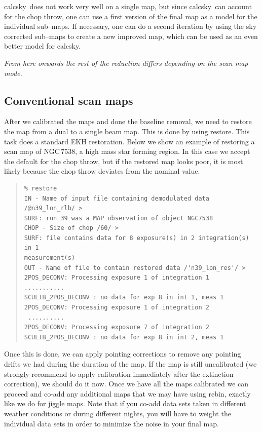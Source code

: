 \documentclass[twoside,11pt]{article}
\newenvironment{myquote}{\begin{quote}\begin{small}}{\end{small}\end{quote}}
\newcommand{\task}[1]{\textsf{#1}}
\newcommand{\rebin}{\xref{\task{rebin}}{sun216}{REBIN}}
\newcommand{\calcsky}{\xref{\task{calcsky}}{sun216}{CALCSKY}}
\newcommand{\restore}{\xref{\task{restore}}{sun216}{RESTORE}}
\newcommand{\xref}[3]{#1}
\newcommand{\xlabel}[1]{}
\renewcommand{\_}{\texttt{\symbol{95}}}
\begin{document}
\calcsky\ does not work very well on a single map, but since \calcsky\
can account for the chop throw, one can use a first version of the
final map as a model for the individual sub--maps.  If necessary, one
can do a second iteration by using the sky corrected sub--maps to
create a new improved map, which can be used as an even better model
for \calcsky.

{\it From here onwards the rest of the reduction differs depending on
the scan map mode.}

\subsection{\xlabel{Conventional_scan_maps}Conventional scan maps}

After we calibrated the maps and done the baseline removal, we need to
restore the map from a dual to a single beam map.  This is done by
using \restore.  This task does a standard EKH restoration.  Below we
show an example of restoring a scan map of NGC\,7538, a high mass star
forming region.  In this case we accept the default for the chop
throw, but if the restored map looks poor, it is most likely because
the chop throw deviates from the nominal value.

\begin{myquote}
\begin{verbatim}
% restore
IN - Name of input file containing demodulated data /@n39_lon_rlb/ >
SURF: run 39 was a MAP observation of object NGC7538
CHOP - Size of chop /60/ > 
SURF: file contains data for 8 exposure(s) in 2 integration(s) in 1
measurement(s)
OUT - Name of file to contain restored data /'n39_lon_res'/ >
2POS_DECONV: Processing exposure 1 of integration 1
...........
SCULIB_2POS_DECONV : no data for exp 8 in int 1, meas 1
2POS_DECONV: Processing exposure 1 of integration 2
 ..........
2POS_DECONV: Processing exposure 7 of integration 2
SCULIB_2POS_DECONV : no data for exp 8 in int 2, meas 1
\end{verbatim}
\end{myquote}

Once this is done, we can apply pointing corrections to remove any
pointing drifts we had during the duration of the map.  If the map is
still uncalibrated (we strongly recommend to apply calibration
immediately after the extinction correction), we should do it now. 
Once we have all the maps calibrated we can proceed and co-add any
additional maps that we may have using \rebin, exactly like we do for
jiggle maps.  Note that if you co-add data sets taken in different
weather conditions or during different nights, you will have to weight
the individual data sets in order to minimize the noise in your final
map.
\end{document}
